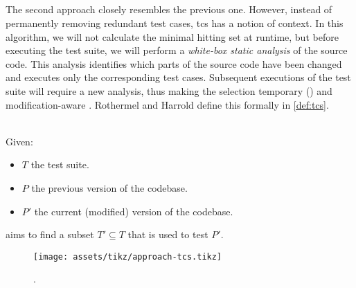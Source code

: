 
\subsection{\tcs{}}
The second approach closely resembles the previous one. However, instead of permanently removing redundant test cases, \acrfull{tcs} has a notion of context. In this algorithm, we will not calculate the minimal hitting set at runtime, but before executing the test suite, we will perform a \emph{white-box static analysis} of the source code. This analysis identifies which parts of the source code have been changed and executes only the corresponding test cases. Subsequent executions of the test suite will require a new analysis, thus making the selection temporary () and modification-aware \cite{10.1002/stv.430}. Rothermel and Harrold define this formally in \cref{def:tcs}.

\begin{definition}[\tcs{}]
\label{def:tcs}
\mbox{}\\Given:
\begin{itemize}
	\item $T$ the test suite.
	\item $P$ the previous version of the codebase.
	\item $P'$ the current (modified) version of the codebase.
\end{itemize}

\noindent \tcs{} aims to find a subset $T' \subseteq T$ that is used to test $P'$. 
\end{definition}

\begin{figure}[htbp!]
	\centering
	\texttt{[image: assets/tikz/approach-tcs.tikz]}
	\caption{\tcs{}.}
	\label{fig:tcs}
\end{figure}

\clearpage